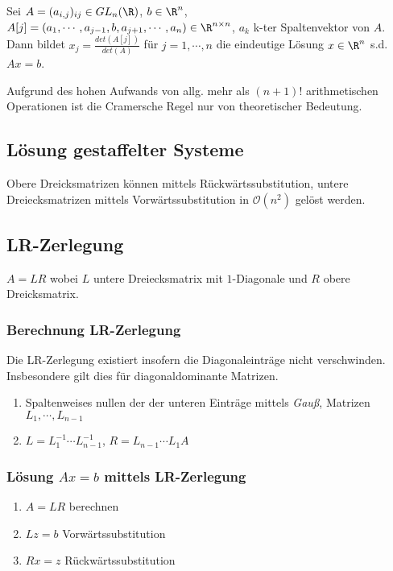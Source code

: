 Sei $A = (a_{i,j})_{ij} \in GL_n(\R)$, $b \in \R^n$, $A[j] = (a_1, \cdots, a_{j-1}, b, a_{j+1}, \cdots, a_n) \in \R^{n \times n}$, $a_k$ k-ter Spaltenvektor von $A$. Dann bildet $x_j = \frac{det(A[j])}{det(A)}$ für $j = 1, \cdots, n$ die eindeutige Lösung $x \in \R^n$ s.d. $Ax=b$.

Aufgrund des hohen Aufwands von allg. mehr als $(n+1)!$ arithmetischen Operationen ist die Cramersche Regel nur von theoretischer Bedeutung.

\subsection*{Lösung gestaffelter Systeme}

Obere Dreicksmatrizen können mittels Rückwärtssubstitution, untere Dreiecksmatrizen mittels Vorwärtssubstitution in $\mathcal{O}(n^2)$ gelöst werden.

\subsection*{LR-Zerlegung}

$A = LR$ wobei $L$ untere Dreiecksmatrix mit $1$-Diagonale und $R$ obere Dreicksmatrix.

\subsubsection*{Berechnung LR-Zerlegung}

Die LR-Zerlegung existiert insofern die Diagonaleinträge nicht verschwinden. Insbesondere gilt dies für diagonaldominante Matrizen.

\begin{enumerate}
	\item Spaltenweises nullen der der unteren Einträge mittels \emph{Gauß}, Matrizen $L_1, \cdots, L_{n-1}$
	\item $L = L_1^{-1} \cdots L_{n-1}^{-1}$, $R=L_{n-1} \cdots L_1 A$
\end{enumerate}

\subsubsection*{Lösung $Ax=b$ mittels LR-Zerlegung}

\begin{enumerate}
	\item $A=LR$ berechnen
	\item $Lz=b$ Vorwärtssubstitution
	\item $Rx=z$ Rückwärtssubstitution
\end{enumerate}


